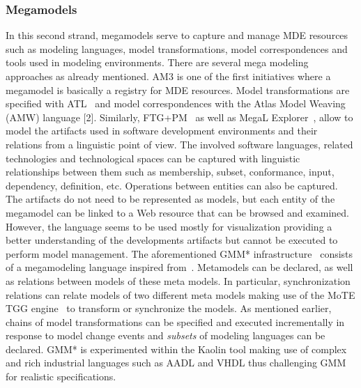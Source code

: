 \subsubsection{Megamodels}
%
In this second strand, megamodels serve to capture and manage
MDE resources such as modeling languages, model transformations, model correspondences and tools used in modeling environments.
There are several mega modeling approaches as already mentioned. AM3 \cite{am3-website} is one of the first initiatives where a megamodel is basically a registry for MDE resources. Model transformations are specified with ATL~\cite{atl-website} and model correspondences with the Atlas Model Weaving (AMW) language [2]. 
Similarly, FTG+PM~\cite{Lucio_et_al:2013} as well as MegaL Explorer~\cite{Favre:2012:MLA:2404962.2404978}, allow to model the artifacts used in software development environments and their relations from a linguistic point of view. 
The involved software languages, related technologies and technological spaces can be captured with linguistic relationships between them such as membership, subset, conformance, input, dependency, definition, etc. Operations between entities can also be captured. The artifacts do not need to be represented as models, but each entity of the megamodel can be linked to a Web resource that can be browsed and examined.
However, the language seems to be used mostly for visualization providing a better understanding of the developments artifacts but cannot be executed to perform model management.
The aforementioned GMM* infrastructure~\cite{BlouinGemoc2014} consists of a megamodeling language inspired from~\cite{HSG2010}. Metamodels can be declared, as well as relations between models of these meta models. In particular, synchronization relations can relate models of two different meta models making use of the MoTE TGG engine~\cite{mote-website} to transform or synchronize the models. As mentioned earlier, chains of model transformations can be specified and executed incrementally in response to model change events and \emph{subsets} of modeling languages can be declared. GMM* is experimented within the Kaolin tool \cite{BlouinAHS2015} making use of complex and rich industrial languages such as AADL and VHDL thus challenging GMM for realistic specifications.


